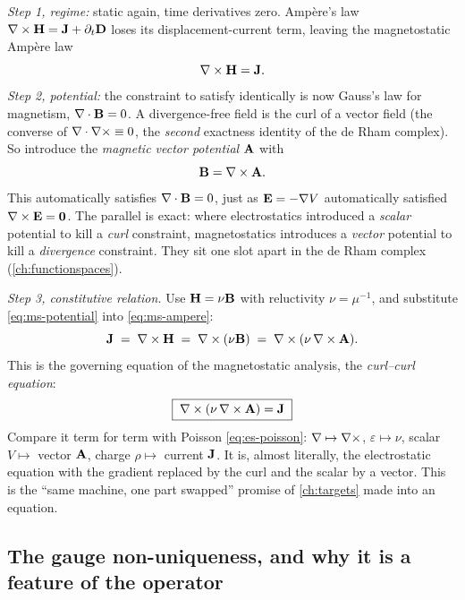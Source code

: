 \emph{Step 1, regime:} static again, time derivatives zero. Amp\`ere's law
$\nabla\times\mathbf{H} = \mathbf{J} + \partial_t\mathbf{D}$ loses its displacement-current term, leaving
the magnetostatic Amp\`ere law
\begin{equation}
  \nabla\times\mathbf{H} = \mathbf{J}.
  \label{eq:ms-ampere}
\end{equation}
\emph{Step 2, potential:} the constraint to satisfy identically is now Gauss's
law for magnetism, $\nabla\cdot\mathbf{B} = 0$. A divergence-free field is the curl of a
vector field (the converse of $\nabla\cdot\nabla\times\equiv 0$, the \emph{second} exactness
identity of the de Rham complex). So introduce the \emph{magnetic vector
potential} $\mathbf{A}$ with
\begin{equation}
  \mathbf{B} = \nabla\times\mathbf{A}.
  \label{eq:ms-potential}
\end{equation}
This automatically satisfies $\nabla\cdot\mathbf{B}=0$, just as $\mathbf{E}=-\nabla V$ automatically
satisfied $\nabla\times\mathbf{E}=\mathbf0$. The parallel is exact: where electrostatics
introduced a \emph{scalar} potential to kill a \emph{curl} constraint,
magnetostatics introduces a \emph{vector} potential to kill a \emph{divergence}
constraint. They sit one slot apart in the de Rham complex
(\cref{ch:functionspaces}).

\emph{Step 3, constitutive relation.} Use $\mathbf{H} = \nu\mathbf{B}$ with reluctivity
$\nu = \mu^{-1}$, and substitute \cref{eq:ms-potential} into
\cref{eq:ms-ampere}:
\begin{equation}
  \mathbf{J} \;=\; \nabla\times\mathbf{H} \;=\; \nabla\times(\nu\mathbf{B}) \;=\; \nabla\times(\nu\,\nabla\times\mathbf{A}).
\end{equation}
This is the governing equation of the magnetostatic analysis, the
\emph{curl--curl equation}:
\begin{equation}
  \boxed{\;\nabla\times(\nu\,\nabla\times\mathbf{A}) = \mathbf{J}\;}
  \label{eq:curlcurl}
\end{equation}
Compare it term for term with Poisson \cref{eq:es-poisson}: $\nabla\mapsto\nabla\times$,
$\varepsilon\mapsto\nu$, scalar $V\mapsto$ vector $\mathbf{A}$, charge
$\rho\mapsto$ current $\mathbf{J}$. It is, almost literally, the electrostatic equation
with the gradient replaced by the curl and the scalar by a vector. This is the
``same machine, one part swapped'' promise of \cref{ch:targets} made into an
equation.

\subsection{The gauge non-uniqueness, and why it is a feature of the operator}

